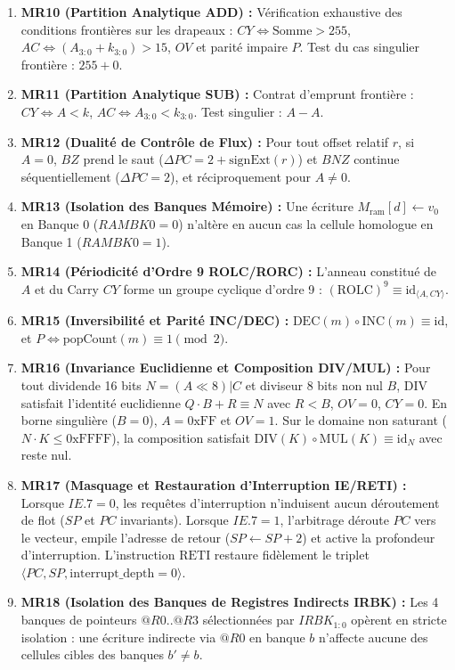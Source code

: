 \documentclass[10pt,journal,compsoc]{IEEEtran}
\begin{document}
\begin{enumerate}
\begin{equation}
    A \land 0 = 0, \quad A \land 0\text{xFF} = A, \quad A \lor 0 = A, \quad A \lor 0\text{xFF} = 0\text{xFF}.
    \end{equation}
    \item \textbf{MR10 (Partition Analytique ADD) :} Vérification exhaustive des conditions frontières sur les drapeaux : $CY \iff \text{Somme} > 255$, $AC \iff (A_{3:0} + k_{3:0}) > 15$, $OV$ et parité impaire $P$. Test du cas singulier frontière : $255 + 0$.
    \item \textbf{MR11 (Partition Analytique SUB) :} Contrat d'emprunt frontière : $CY \iff A < k$, $AC \iff A_{3:0} < k_{3:0}$. Test singulier : $A - A$.
    \item \textbf{MR12 (Dualité de Contrôle de Flux) :} Pour tout offset relatif $r$, si $A = 0$, $BZ$ prend le saut ($\Delta PC = 2 + \text{signExt}(r)$) et $BNZ$ continue séquentiellement ($\Delta PC = 2$), et réciproquement pour $A \neq 0$.
    \item \textbf{MR13 (Isolation des Banques Mémoire) :} Une écriture $M_{\text{ram}}[d] \leftarrow v_0$ en Banque 0 ($RAMBK0=0$) n'altère en aucun cas la cellule homologue en Banque 1 ($RAMBK0=1$).
    \item \textbf{MR14 (Périodicité d'Ordre 9 ROLC/RORC) :} L'anneau constitué de $A$ et du Carry $CY$ forme un groupe cyclique d'ordre 9 : $(\text{ROLC})^9 \equiv \text{id}_{\langle A, CY \rangle}$.
    \item \textbf{MR15 (Inversibilité et Parité INC/DEC) :} $\text{DEC}(m) \circ \text{INC}(m) \equiv \text{id}$, et $P \iff \text{popCount}(m) \equiv 1 \pmod 2$.
    \item \textbf{MR16 (Invariance Euclidienne et Composition DIV/MUL) :} Pour tout dividende 16 bits $N = (A \ll 8) | C$ et diviseur 8 bits non nul $B$, $\text{DIV}$ satisfait l'identité euclidienne $Q \cdot B + R \equiv N$ avec $R < B$, $OV=0$, $CY=0$. En borne singulière ($B=0$), $A=0\text{xFF}$ et $OV=1$. Sur le domaine non saturant ($N \cdot K \le 0\text{xFFFF}$), la composition satisfait $\text{DIV}(K) \circ \text{MUL}(K) \equiv \text{id}_N$ avec reste nul.
    \item \textbf{MR17 (Masquage et Restauration d'Interruption IE/RETI) :} Lorsque $IE.7=0$, les requêtes d'interruption n'induisent aucun déroutement de flot ($SP$ et $PC$ invariants). Lorsque $IE.7=1$, l'arbitrage déroute $PC$ vers le vecteur, empile l'adresse de retour ($SP \leftarrow SP+2$) et active la profondeur d'interruption. L'instruction $\text{RETI}$ restaure fidèlement le triplet $\langle PC, SP, \text{interrupt\_depth}=0 \rangle$.
    \item \textbf{MR18 (Isolation des Banques de Registres Indirects IRBK) :} Les 4 banques de pointeurs $@R0..@R3$ sélectionnées par $IRBK_{1:0}$ opèrent en stricte isolation : une écriture indirecte via $@R0$ en banque $b$ n'affecte aucune des cellules cibles des banques $b' \ne b$.
\end{enumerate}
\end{document}

